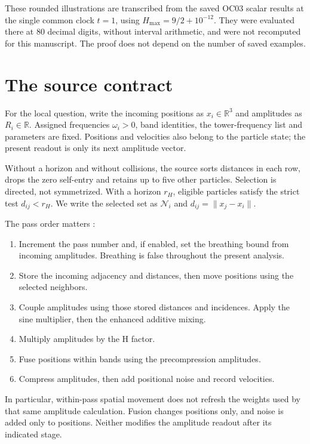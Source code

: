 \documentclass[11pt,a4paper]{article}
\theoremstyle{remark}\newtheorem{remark}[theorem]{Remark}
\newcommand{\R}{\mathbb R}
\numberwithin{equation}{section}
\begin{document}
These rounded illustrations are transcribed from the saved OC03 scalar
results at the single common clock $t=1$, using $H_{\max}=9/2+10^{-12}$.
They were evaluated there at 80 decimal digits, without interval arithmetic,
and were not recomputed for this manuscript. The proof does not depend on
the number of saved examples.

\section{The source contract}\label{sec:contract}

For the local question, write the incoming positions as $x_i\in\R^3$ and
amplitudes as $R_i\in\R$. Assigned frequencies $\omega_i>0$, band identities,
the tower-frequency list and parameters are fixed. Positions and velocities
also belong to the particle state; the present readout is only its next
amplitude vector.

Without a horizon and without collisions, the source sorts distances in
each row, drops the zero self-entry and retains up to five other particles.
Selection is directed, not symmetrized. With a horizon $r_H$, eligible
particles satisfy the strict test $d_{ij}<r_H$. We write the selected
set as $\mathcal N_i$ and $d_{ij}=\|x_j-x_i\|$.

The pass order matters \cite[lines 129--215]{T}:
\begin{enumerate}
\item Increment the pass number and, if enabled, set the breathing bound from
incoming amplitudes. Breathing is false throughout the present analysis.
\item Store the incoming adjacency and distances, then move positions using
the selected neighbors.
\item Couple amplitudes using those stored distances and incidences.
Apply the sine multiplier, then the enhanced additive mixing.
\item Multiply amplitudes by the H factor.
\item Fuse positions within bands using the precompression amplitudes.
\item Compress amplitudes, then add positional noise and record velocities.
\end{enumerate}
In particular, within-pass spatial movement does not refresh the weights
used by that same amplitude calculation. Fusion changes positions only, and
noise is added only to positions. Neither modifies the amplitude readout
after its indicated stage.
\end{document}
